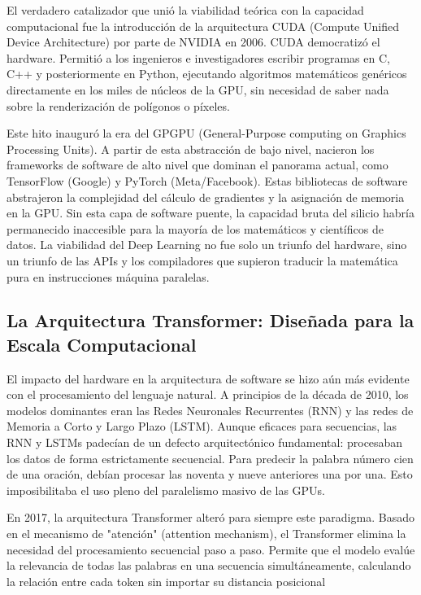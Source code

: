 \documentclass[12pt,a4paper]{article}
\begin{document}
El verdadero catalizador que unió la viabilidad teórica con la capacidad computacional fue la introducción de la arquitectura CUDA (Compute Unified Device Architecture) por parte de NVIDIA en 2006. CUDA democratizó el hardware. Permitió a los ingenieros e investigadores escribir programas en C, C++ y posteriormente en Python, ejecutando algoritmos matemáticos genéricos directamente en los miles de núcleos de la GPU, sin necesidad de saber nada sobre la renderización de polígonos o píxeles. 

Este hito inauguró la era del GPGPU (General-Purpose computing on Graphics Processing Units). A partir de esta abstracción de bajo nivel, nacieron los frameworks de software de alto nivel que dominan el panorama actual, como TensorFlow (Google) y PyTorch (Meta/Facebook). Estas bibliotecas de software abstrajeron la complejidad del cálculo de gradientes y la asignación de memoria en la GPU. Sin esta capa de software puente, la capacidad bruta del silicio habría permanecido inaccesible para la mayoría de los matemáticos y científicos de datos. La viabilidad del Deep Learning no fue solo un triunfo del hardware, sino un triunfo de las APIs y los compiladores que supieron traducir la matemática pura en instrucciones máquina paralelas.

\subsection{La Arquitectura Transformer: Diseñada para la Escala Computacional}

El impacto del hardware en la arquitectura de software se hizo aún más evidente con el procesamiento del lenguaje natural. A principios de la década de 2010, los modelos dominantes eran las Redes Neuronales Recurrentes (RNN) y las redes de Memoria a Corto y Largo Plazo (LSTM). Aunque eficaces para secuencias, las RNN y LSTMs padecían de un defecto arquitectónico fundamental: procesaban los datos de forma estrictamente secuencial. Para predecir la palabra número cien de una oración, debían procesar las noventa y nueve anteriores una por una. Esto imposibilitaba el uso pleno del paralelismo masivo de las GPUs.

En 2017, la arquitectura Transformer alteró para siempre este paradigma. Basado en el mecanismo de "atención" (attention mechanism), el Transformer elimina la necesidad del procesamiento secuencial paso a paso. Permite que el modelo evalúe la relevancia de todas las palabras en una secuencia simultáneamente, calculando la relación entre cada token sin importar su distancia posicional
\end{document}
